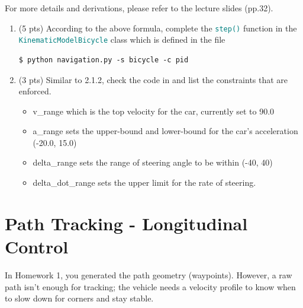 \documentclass[11pt]{article}
\begin{document}
For more details and derivations, please refer to the lecture slides (pp.32).
\begin{enumerate}
    \item \textbf{\faPython} (5 pts) According to the above formula, complete the \textcolor{teal}{\texttt{step()}} function in the \textcolor{teal}{\texttt{KinematicModelBicycle}} class which is defined in the file \textcolor{teal}{}
          \begin{lstlisting}
$ python navigation.py -s bicycle -c pid
          \end{lstlisting}
    \item \textbf{\faPen} (3 pts) Similar to 2.1.2, check the code in \textcolor{teal}{\texttt{\allowbreak{}}} and list the constraints that are enforced.
          \begin{itemize}
            \color{blue}
                \item v\_range which is the top velocity for the car, currently set to 90.0 
                \item a\_range sets the upper-bound and lower-bound for the car's acceleration (-20.0, 15.0)
                \item delta\_range sets the range of steering angle to be within (-40, 40)
                \item delta\_dot\_range sets the upper limit for the rate of steering. 
          \end{itemize}
\end{enumerate}

\section{Path Tracking - Longitudinal Control}
In Homework 1, you generated the path geometry (waypoints). However, a raw path isn't enough for tracking; the vehicle needs a velocity profile to know when to slow down for corners and stay stable.
\end{document}
